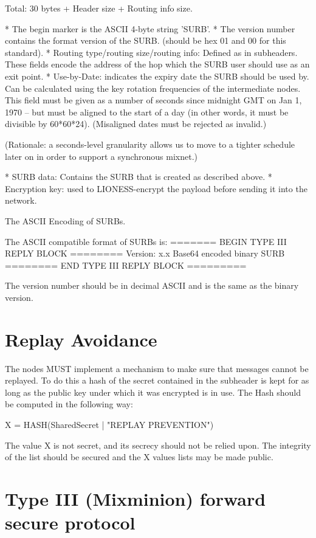    Total: 30 bytes + Header size + Routing info size.

* The begin marker is the ASCII 4-byte string 'SURB'. 
* The version number contains the format version of the SURB.
  (should be hex 01 and 00 for this standard).
* Routing type/routing size/routing info: Defined as in subheaders.
  These fields encode the address of the hop which the SURB user should
  use as an exit point.
* Use-by-Date: indicates the expiry date the SURB should be used by. Can
  be calculated using the key rotation frequencies of the intermediate
  nodes.  This field must be given as a number of seconds since
  midnight GMT on Jan 1, 1970 -- but must be aligned to the start of a
  day (in other words, it must be divisible by 60*60*24).
  (Misaligned dates must be rejected as invalid.)

  (Rationale: a seconds-level granularity allows us to move to a
  tighter schedule later on in order to support a synchronous mixnet.)

* SURB data: Contains the SURB that is created as described above.
* Encryption key: used to LIONESS-encrypt the payload before sending it
  into the network.  

The ASCII Encoding of SURBs.

The  ASCII compatible format of SURBs is:
======= BEGIN TYPE III REPLY BLOCK ========
Version: x.x
Base64 encoded binary SURB 
======== END TYPE III REPLY BLOCK =========

The version number should be in decimal ASCII and is the same as the
binary version.

\section{Replay Avoidance}

The nodes MUST implement a mechanism to make sure that messages cannot
be replayed. To do this a hash of the secret contained in the
subheader is kept for as long as the public key under which it was
encrypted is in use. The Hash should be computed in the following way:

X = HASH(SharedSecret | "REPLAY PREVENTION")

The value X is not secret, and its secrecy should not be relied upon.
The integrity of the list should be secured and the X values lists may
be made public.

\section{Type III (Mixminion) forward secure protocol}

